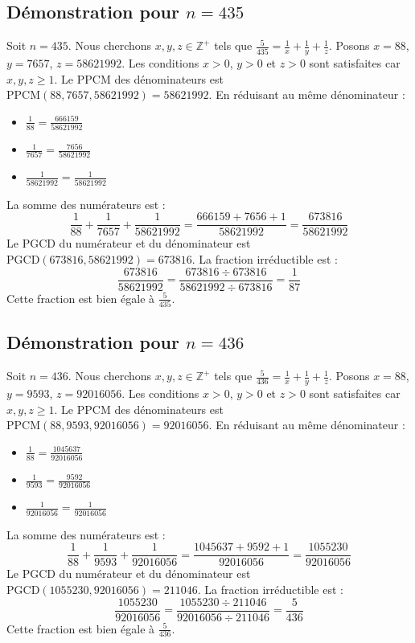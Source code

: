 \documentclass[11pt,a4paper]{article}
\begin{document}
\subsection{Démonstration pour $n = 435$}
Soit $n = 435$. Nous cherchons $x, y, z \in \mathbb{Z}^{+}$ tels que $\frac{5}{435} = \frac{1}{x} + \frac{1}{y} + \frac{1}{z}$.
Posons $x = 88$, $y = 7657$, $z = 58621992$.
Les conditions $x > 0$, $y > 0$ et $z > 0$ sont satisfaites car $x, y, z \geq 1$.
Le PPCM des dénominateurs est $\text{PPCM}(88, 7657, 58621992) = 58621992$.
En réduisant au même dénominateur :
\begin{itemize}
    \item $\frac{1}{88} = \frac{666159}{58621992}$
    \item $\frac{1}{7657} = \frac{7656}{58621992}$
    \item $\frac{1}{58621992} = \frac{1}{58621992}$
\end{itemize}
La somme des numérateurs est :
$$ \frac{1}{88} + \frac{1}{7657} + \frac{1}{58621992} = \frac{666159 + 7656 + 1}{58621992} = \frac{673816}{58621992} $$
Le PGCD du numérateur et du dénominateur est $\text{PGCD}(673816, 58621992) = 673816$.
La fraction irréductible est :
$$ \frac{673816}{58621992} = \frac{673816 \div 673816}{58621992 \div 673816} = \frac{1}{87} $$
Cette fraction est bien égale à $\frac{5}{435}$.

\subsection{Démonstration pour $n = 436$}
Soit $n = 436$. Nous cherchons $x, y, z \in \mathbb{Z}^{+}$ tels que $\frac{5}{436} = \frac{1}{x} + \frac{1}{y} + \frac{1}{z}$.
Posons $x = 88$, $y = 9593$, $z = 92016056$.
Les conditions $x > 0$, $y > 0$ et $z > 0$ sont satisfaites car $x, y, z \geq 1$.
Le PPCM des dénominateurs est $\text{PPCM}(88, 9593, 92016056) = 92016056$.
En réduisant au même dénominateur :
\begin{itemize}
    \item $\frac{1}{88} = \frac{1045637}{92016056}$
    \item $\frac{1}{9593} = \frac{9592}{92016056}$
    \item $\frac{1}{92016056} = \frac{1}{92016056}$
\end{itemize}
La somme des numérateurs est :
$$ \frac{1}{88} + \frac{1}{9593} + \frac{1}{92016056} = \frac{1045637 + 9592 + 1}{92016056} = \frac{1055230}{92016056} $$
Le PGCD du numérateur et du dénominateur est $\text{PGCD}(1055230, 92016056) = 211046$.
La fraction irréductible est :
$$ \frac{1055230}{92016056} = \frac{1055230 \div 211046}{92016056 \div 211046} = \frac{5}{436} $$
Cette fraction est bien égale à $\frac{5}{436}$.
\end{document}
